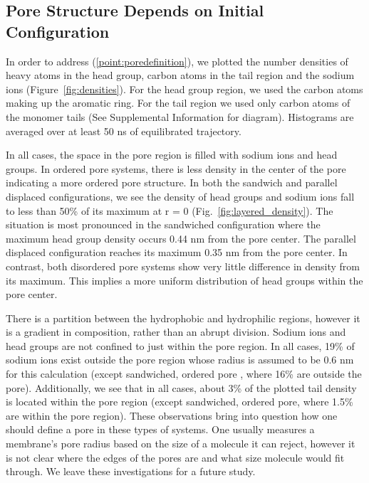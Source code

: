 \documentclass{article}
\begin{document}
  \subsection{Pore Structure Depends on Initial Configuration}  %

  In order to address (\ref{point:poredefinition}), we plotted the number
  densities of heavy atoms in the head group, carbon atoms in the tail region
  and the sodium ions (Figure~\ref{fig:densities}). For the head group region,
  we used the carbon atoms making up the aromatic ring. For the tail region we
  used only carbon atoms of the monomer tails (See Supplemental Information for
  diagram). Histograms are averaged over at least 50 ns of equilibrated trajectory.

  In all cases, the space in the pore region is filled with sodium ions and
  head groups. In ordered pore systems, there is less density in the center of
  the pore indicating a more ordered pore structure. In both the sandwich and
  parallel displaced configurations, we see the density of head groups and sodium
  ions fall to less than 50\% of its maximum at r = 0
  (Fig.~\ref{fig:layered_density}). The situation is most pronounced in the
  sandwiched configuration where the maximum head group density occurs 0.44 nm
  from the pore center. The parallel displaced configuration reaches its maximum
  0.35 nm from the pore center. In contrast, both disordered pore systems show
  very little difference in density from its maximum. This implies a more uniform
  distribution of head groups within the pore center. 

  There is a partition between the hydrophobic and hydrophilic regions, however
  it is a gradient in composition, rather than an abrupt division. Sodium ions
  and head groups are not confined to just within the pore region. In all cases,
  19\% of sodium ions exist outside the pore region whose radius is assumed to be
  0.6 nm for this calculation (except sandwiched, ordered pore , where 16\% are
  outside the pore). Additionally, we see that in all cases, about 3\% of the
  plotted tail density is located within the pore region (except sandwiched,
  ordered pore, where 1.5\% are within the pore region). These observations bring
  into question how one should define a pore in these types of systems. One
  usually measures a membrane's pore radius based on the size of a molecule it
  can reject, however it is not clear where the edges of the pores are and what
  size molecule would fit through. We leave these investigations for a future
  study.
\end{document}
